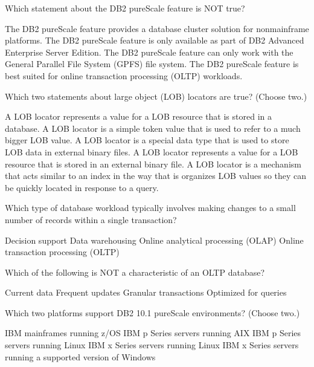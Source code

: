 \documentclass[11pt]{exam}
\begin{document}
\begin{questions}
\newpage
\addpoints
\question[1]
Which statement about the DB2 pureScale feature is NOT true?
\begin{choices}
\choice The DB2 pureScale feature provides a database cluster solution for nonmainframe platforms.
\choice The DB2 pureScale feature is only available as part of DB2 Advanced Enterprise Server Edition.
\choice The DB2 pureScale feature can only work with the General Parallel File System (GPFS) file system.
\choice The DB2 pureScale feature is best suited for online transaction processing (OLTP) workloads.
\end{choices}

\question[1]
Which two statements about large object (LOB) locators are true? (Choose two.)
\begin{choices}
\choice A LOB locator represents a value for a LOB resource that is stored in a database.
\choice A LOB locator is a simple token value that is used to refer to a much bigger LOB value.
\choice A LOB locator is a special data type that is used to store LOB data in external binary files.
\choice A LOB locator represents a value for a LOB resource that is stored in an external binary file.
\choice A LOB locator is a mechanism that acts similar to an index in the way that is organizes LOB values
		so they can be quickly located in response to a query.
\end{choices}

\question[1]
Which type of database workload typically involves making changes to a small number of records within
a single transaction?
\begin{choices}
\choice Decision support
\choice Data warehousing
\choice Online analytical processing (OLAP)
\choice Online transaction processing (OLTP)
\end{choices}

\question[1]
Which of the following is NOT a characteristic of an OLTP database?
\begin{choices}
\choice Current data
\choice Frequent updates
\choice Granular transactions
\choice Optimized for queries
\end{choices}

\question[1]
Which two platforms support DB2 10.1 pureScale environments? (Choose two.)
\begin{choices}
\choice IBM mainframes running z/OS
\choice IBM p Series servers running AIX
\choice IBM p Series servers running Linux
\choice IBM x Series servers running Linux
\choice IBM x Series servers running a supported version of Windows
\end{choices}


\end{questions}
\end{document}

